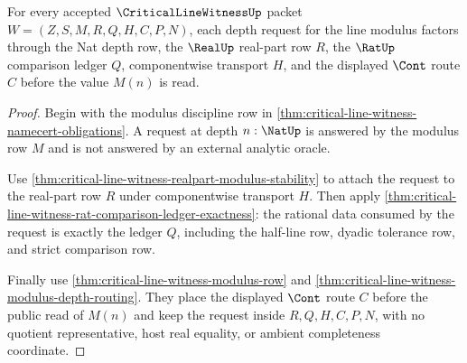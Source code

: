 \begin{theorem}
\label{thm:critical-line-witness-modulus-request-factorization}
For every accepted $\CriticalLineWitnessUp$ packet $W=(Z,S,M,R,Q,H,C,P,N)$, each depth request for the line modulus factors through the Nat depth row, the $\RealUp$ real-part row $R$, the $\RatUp$ comparison ledger $Q$, componentwise transport $H$, and the displayed $\Cont$ route $C$ before the value $M(n)$ is read.
\end{theorem}
\begin{proof}
Begin with the modulus discipline row in \autoref{thm:critical-line-witness-namecert-obligations}. A request at depth $n:\NatUp$ is answered by the modulus row $M$ and is not answered by an external analytic oracle.

Use \autoref{thm:critical-line-witness-realpart-modulus-stability} to attach the request to the real-part row $R$ under componentwise transport $H$. Then apply \autoref{thm:critical-line-witness-rat-comparison-ledger-exactness}: the rational data consumed by the request is exactly the ledger $Q$, including the half-line row, dyadic tolerance row, and strict comparison row.

Finally use \autoref{thm:critical-line-witness-modulus-row} and \autoref{thm:critical-line-witness-modulus-depth-routing}. They place the displayed $\Cont$ route $C$ before the public read of $M(n)$ and keep the request inside $R,Q,H,C,P,N$, with no quotient representative, host real equality, or ambient completeness coordinate.
\end{proof}

